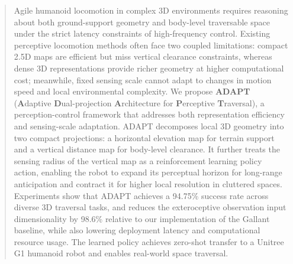 \begin{abstract}
% 
% 
Agile humanoid locomotion in complex 3D environments requires reasoning about both ground-support geometry and body-level traversable space under the strict latency constraints of high-frequency control. Existing perceptive locomotion methods often face two coupled limitations: compact 2.5D maps are efficient but miss vertical clearance constraints, whereas dense 3D representations provide richer geometry at higher computational cost; meanwhile, fixed sensing scale cannot adapt to changes in motion speed and local environmental complexity. We propose \textbf{ADAPT} (\textbf{A}daptive \textbf{D}ual-projection \textbf{A}rchitecture for \textbf{P}erceptive \textbf{T}raversal), a perception-control framework that addresses both representation efficiency and sensing-scale adaptation. ADAPT decomposes local 3D geometry into two compact projections: a horizontal elevation map for terrain support and a vertical distance map for body-level clearance. It further treats the sensing radius of the vertical map as a reinforcement learning policy action, enabling the robot to expand its perceptual horizon for long-range anticipation and contract it for higher local resolution in cluttered spaces. Experiments show that ADAPT achieves a 94.75\% success rate across diverse 3D traversal tasks, and reduces the exteroceptive observation input dimensionality by 98.6\% relative to our implementation of the Gallant baseline, while also lowering deployment latency and computational resource usage. The learned policy achieves zero-shot transfer to a Unitree G1 humanoid robot and enables real-world space traversal.
\end{abstract}